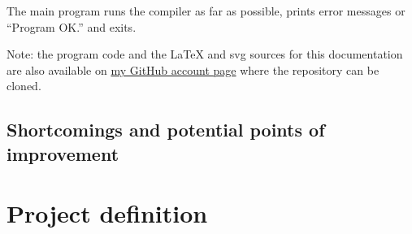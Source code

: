 \documentclass[a4paper,11pt]{article}
\begin{document}
The main program runs the compiler as far as possible, prints error messages or ``Program OK.'' and exits.

Note: the program code and the \LaTeX{} and svg sources for this documentation are also available on \href{https://github.com/Lateks/MiniJavaCompiler}{my GitHub account page} where the repository can be cloned.

\subsection{Shortcomings and potential points of improvement}

\appendix
\section{Project definition}
\end{document}
